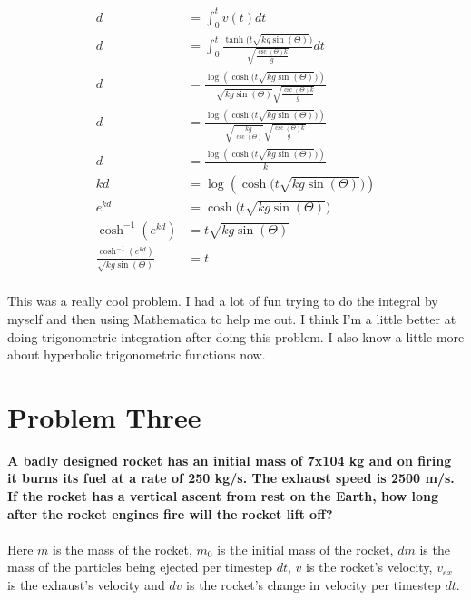 \documentclass[10pt]{article} %
\begin{document}
\begin{align*}
  d &= \int_0^t v(t) dt\\
  d &= \int_0^t \frac{\tanh\Big(t\sqrt{kg\sin(\Theta)}\Big)}{\sqrt{\frac{\csc(\Theta)k}{g}}} dt\\
  d &= \frac{\log(\cosh\Big(t\sqrt{kg\sin(\Theta)}\Big))}{\sqrt{kg\sin(\Theta)}\sqrt{\frac{\csc(\Theta)k}{g}}}\\
  d &= \frac{\log(\cosh\Big(t\sqrt{kg\sin(\Theta)}\Big))}{\sqrt{\frac{kg}{\csc(\Theta)}}\sqrt{\frac{\csc(\Theta)k}{g}}}\\
 d &= \frac{\log(\cosh\Big(t\sqrt{kg\sin(\Theta)}\Big))}{k}\\    
  kd &= \log(\cosh\Big(t\sqrt{kg\sin(\Theta)}\Big))\\
  e^{kd} &= \cosh\Big(t\sqrt{kg\sin(\Theta)}\Big)\\
  \cosh^{-1}(e^{kd}) &= t\sqrt{kg\sin(\Theta)}\\
  \frac{\cosh^{-1}(e^{kd})}{\sqrt{kg\sin(\Theta)}} &= t\\        
\end{align*}

This was a really cool problem. I had a lot of fun trying to do the integral by myself and then using Mathematica to help me out. I think I'm a little better at doing trigonometric integration after doing this problem. I also know a little more about hyperbolic trigonometric functions now.\\

\vspace{1 cm}

\section{Problem Three}
\textbf{A badly designed rocket has an initial mass of 7x104 kg and on firing it burns its fuel at a rate of 250 kg/s. The exhaust speed is 2500 m/s. If the rocket has a vertical ascent from rest on the Earth, how long after the rocket engines fire will the rocket lift off?} \\ \\
Here $m$ is the mass of the rocket, $m_0$ is the initial mass of the rocket, $dm$ is the mass of the particles being ejected per timestep $dt$, $v$ is the rocket's velocity, $v_{ex}$ is the exhaust's velocity and $dv$ is the rocket's change in velocity per timestep $dt$.
\end{document}
